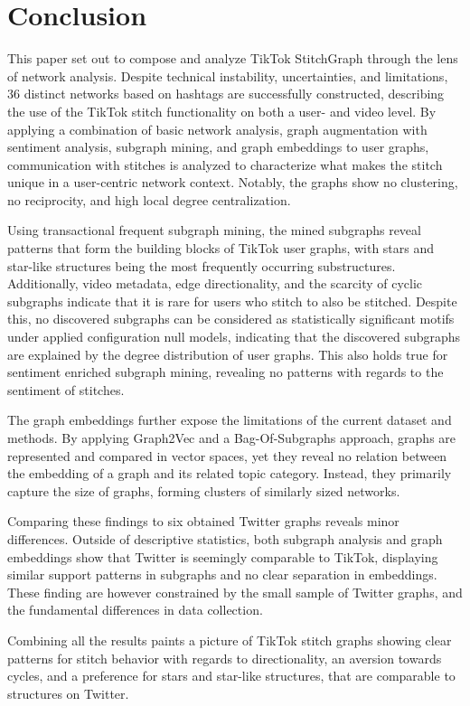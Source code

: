 \chapter{Conclusion}
\label{conclusion}

This paper set out to compose and analyze TikTok StitchGraph through the lens of network analysis. Despite technical instability, uncertainties, and limitations, $36$ distinct networks based on hashtags are successfully constructed, describing the use of the TikTok stitch functionality on both a user- and video level. 
By applying a combination of basic network analysis, graph augmentation with sentiment analysis, subgraph mining, and graph embeddings to user graphs, communication with stitches is analyzed to characterize what makes the stitch unique in a user-centric network context. Notably, the graphs show no clustering, no reciprocity, and high local degree centralization.


Using transactional frequent subgraph mining, the mined subgraphs reveal patterns that form the building blocks of TikTok user graphs, with stars and star-like structures being the most frequently occurring substructures. Additionally, video metadata, edge directionality, and the scarcity of cyclic subgraphs indicate that it is rare for users who stitch to also be stitched. Despite this, no discovered subgraphs can be considered as statistically significant motifs under applied configuration null models, indicating that the discovered subgraphs are explained by the degree distribution of user graphs. This also holds true for sentiment enriched subgraph mining, revealing no patterns with regards to the sentiment of stitches. 

The graph embeddings further expose the limitations of the current dataset and methods. By applying Graph2Vec and a Bag-Of-Subgraphs approach, graphs are represented and compared in vector spaces, yet they reveal no relation between the embedding of a graph and its related topic category. Instead, they primarily capture the size of graphs, forming clusters of similarly sized networks. 

Comparing these findings to six obtained Twitter graphs reveals minor differences. Outside of descriptive statistics, both subgraph analysis and graph embeddings show that Twitter is seemingly comparable to TikTok, displaying similar support patterns in subgraphs and no clear separation in embeddings. These finding are however constrained by the small sample of Twitter graphs, and the fundamental differences in data collection. 

Combining all the results paints a picture of TikTok stitch graphs showing clear patterns for stitch behavior with regards to directionality, an aversion towards cycles, and a preference for stars and star-like structures, that are comparable to structures on Twitter.
